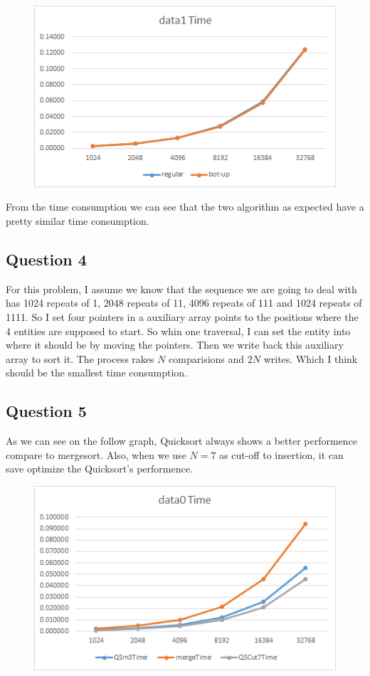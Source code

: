 \documentclass[conference]{IEEEtran}
\begin{document}
\begin{figure}[H]
    \centerline{\includegraphics[scale=0.65]{Pic/pic9.png}}
\end{figure}

From the time consumption we can see that the two algorithm as expected have a pretty 
similar time consumption.

\subsection*{Question 4}
For this problem, I assume we know that the sequence we are going to deal with has 
1024 repeats of 1, 2048 repeats of 11, 4096 repeats of 111 and 1024 repeats of 1111.
So I set four pointers in a auxiliary array points to the positions where the 4 entities 
are supposed to start. So whin one traversal, I can set the entity into where it 
should be by moving the pointers. Then we write back this auxiliary array to sort it.
The process rakes $N$ comparisions and $2N$ writes. Which I think should be the smallest
time consumption.

\subsection*{Question 5}
As we can see on the follow graph, Quicksort always shows a better performence compare
to mergesort. Also, when we use $N=7$ as cut-off to insertion, it can save optimize the 
Quicksort's performence.

\begin{figure}[H]
    \centerline{\includegraphics[scale=0.65]{Pic/pic10.png}}
\end{figure}
\end{document}
